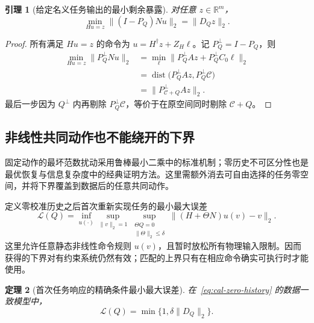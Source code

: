 \documentclass[11pt,a4paper]{article}
\numberwithin{equation}{section}
\newtheorem{theorem}{定理}[section]
\newtheorem{lemma}[theorem]{引理}
\theoremstyle{definition}
\begin{document}
\begin{lemma}[给定名义任务输出的最小剩余暴露]
\label{lem:cal-DQ}
对任意 $z\in\mathbb R^m$，
\begin{equation}
  \min_{Hu=z}\|(I-P_Q)Nu\|_2
  =\|D_Qz\|_2 .
  \label{eq:cal-exposure-z}
\end{equation}
\end{lemma}

\begin{proof}
所有满足 $Hu=z$ 的命令为 $u=H^\dagger z+Z_H\ell$。记 $P_Q^\perp=I-P_Q$，则
\begin{align}
  \min_{Hu=z}\|P_Q^\perp Nu\|_2
  &=
  \min_\ell
  \|P_Q^\perp Az+P_Q^\perp C_0\ell\|_2\\
  &=
  \operatorname{dist}
  \big(P_Q^\perp Az,P_Q^\perp\mathcal C\big)\\
  &=\|P_{\mathcal C+Q}^\perp Az\|_2 .
\end{align}
最后一步因为 $Q^\perp$ 内再剔除 $P_Q^\perp\mathcal C$，等价于在原空间同时剔除 $\mathcal C+Q$。
\end{proof}

\subsection{非线性共同动作也不能绕开的下界}
固定动作的最坏范数扰动采用鲁棒最小二乘中的标准机制\cite{elghaoui1997}；零历史不可区分性也是最优恢复与信息复杂度中的经典证明方法\cite{plaskota2023}。这里需额外消去可自由选择的任务零空间，并将下界覆盖到数据后的任意共同动作。


定义零校准历史之后首次重新实现任务的最小最大误差
\begin{equation}
  \mathcal L(Q)=
  \inf_{u(\cdot)}
  \sup_{\|v\|_2=1}
  \sup_{\substack{\Theta Q=0\\\|\Theta\|_2\le\delta}}
  \|(H+\Theta N)u(v)-v\|_2 .
  \label{eq:cal-first-loss}
\end{equation}
这里允许任意静态非线性命令规则 $u(v)$，且暂时放松所有物理输入限制。因而获得的下界对有约束系统仍然有效；匹配的上界只有在相应命令确实可执行时才能使用。

\begin{theorem}[首次任务响应的精确条件最小最大误差]
\label{thm:cal-first-loss}
在~\eqref{eq:cal-zero-history} 的数据一致模型中，
\begin{equation}
  \boxed{\mathcal L(Q)=
  \min\{1,\delta\|D_Q\|_2\}.}
  \label{eq:cal-first-exact}
\end{equation}
\end{theorem}
\end{document}
